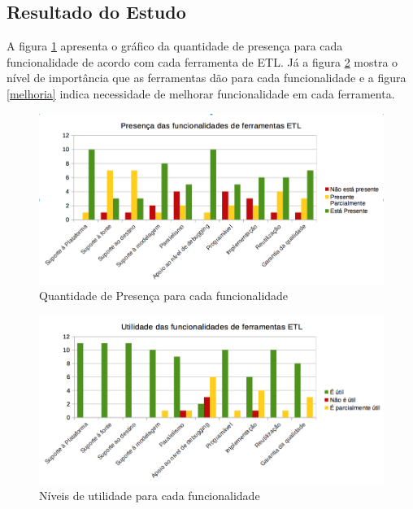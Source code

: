 \clearpage

\subsection{Resultado do Estudo}


A figura \ref{presenca} apresenta o gráfico da quantidade de presença para cada funcionalidade de acordo com cada ferramenta de ETL. Já a figura \ref{utilidade} mostra o nível de importância que as ferramentas dão para cada funcionalidade e a figura \ref{melhoria} indica necessidade de melhorar funcionalidade em cada ferramenta.

\begin{figure}[h]
	\centering
	\includegraphics[scale=0.4]{fig/presenca.png}
	\caption{Quantidade de Presença para cada funcionalidade}
	\label{presenca}
\end{figure}

\begin{figure}[h]
	\centering
	\includegraphics[scale=0.4]{fig/utilidade.png}
	\caption{Níveis de utilidade para cada funcionalidade}
	\label{utilidade}
\end{figure}

